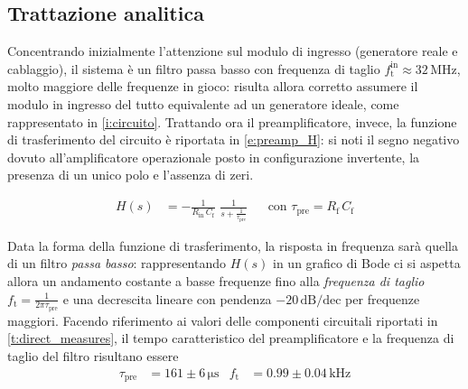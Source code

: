 \documentclass[a4paper,11pt]{article} %
\begin{document}

\subsection{Trattazione analitica}\label{s:preamp_th} 

Concentrando inizialmente l'attenzione sul modulo di ingresso (generatore reale e cablaggio), il sistema è un filtro
passa basso con frequenza di taglio $f_{\text{t}}^{\text{in}}\approx 32 \,\si{\MHz}$, molto maggiore delle frequenze in
gioco: risulta allora corretto assumere il modulo in ingresso del tutto equivalente ad un generatore ideale, come
rappresentato in \autoref{i:circuito}. Trattando ora il preamplificatore, invece, la funzione di trasferimento del
circuito è riportata in \autoref{e:preamp_H}: si noti il segno negativo dovuto all'amplificatore operazionale posto in
configurazione invertente, la presenza di un unico polo e l'assenza di zeri. 

\begin{align}\label{e:preamp_H} 
	H(s) &= - \frac{ 1 }{ R_{\text{in}}\,C_{\text{f}} } \,\, \frac{1}{ s + \frac{1}{\tau_{\text{pre}} } } 
	& 
	&\text{con} \,\, \tau_{\text{pre}} = R_{\text{f}}\,C_{\text{f}}
\end{align} 

Data la forma della funzione di trasferimento, la risposta in frequenza sarà quella di un filtro \textit{passa basso}:
rappresentando $H(s)$ in un grafico di Bode ci si aspetta allora un andamento costante a basse frequenze fino alla
\textit{frequenza di taglio} $f_{\text{t}}=\frac{1}{2\pi\tau_{\text{pre}}}$ e una decrescita lineare con pendenza
$-20\,\text{dB/dec}$ per frequenze maggiori. Facendo riferimento ai valori delle componenti circuitali riportati in
\autoref{t:direct_measures}, il tempo caratteristico del preamplificatore e la frequenza di taglio del filtro risultano
essere
\begin{align}
	\tau_{\text{pre}} & = 161 \pm 6 \,\si{\us}
	&
	f_{\text{t}} & = 0.99 \pm 0.04 \,\si{\kilo\Hz}
\end{align}
\end{document}
